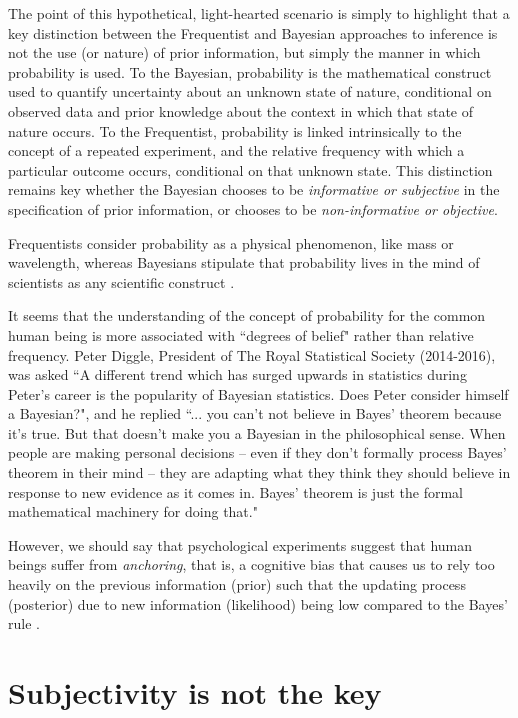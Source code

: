 The point of this hypothetical, light-hearted scenario is simply to highlight that a key distinction between the Frequentist and Bayesian approaches to inference is not the use (or nature) of prior information, but simply the manner in which probability is used. To the Bayesian, probability is the mathematical construct used to quantify uncertainty about an unknown state of nature, conditional on observed data and prior knowledge about the context in which that state of nature occurs. To the Frequentist, probability is linked intrinsically to the concept of a repeated experiment, and the relative frequency with which a particular outcome occurs, conditional on that unknown state. This distinction remains key whether the Bayesian chooses to be \textit{informative or subjective} in the specification of prior information, or chooses to be \textit{non-informative or objective}.

Frequentists consider probability as a physical phenomenon, like mass or wavelength, whereas Bayesians stipulate that probability lives in the mind of scientists as any scientific construct \cite{Parmigiani2008}.

It seems that the understanding of the concept of probability for the common human being is more associated with ``degrees of belief" rather than relative frequency. Peter Diggle, President of The Royal Statistical Society (2014-2016), was asked ``A different trend which has surged upwards in statistics during Peter's career is the popularity of Bayesian statistics. Does Peter consider himself a Bayesian?", and he replied ``... you can't not believe in Bayes' theorem because it's true. But that doesn't make you a Bayesian in the philosophical sense. When people are making personal decisions -- even if they don't formally process Bayes' theorem in their mind -- they are adapting what they think they should believe in response to new evidence as it comes in. Bayes' theorem is just the formal mathematical machinery for doing that."

However, we should say that psychological experiments suggest that human beings suffer from \textit{anchoring}, that is, a cognitive bias that causes us to rely too heavily on the previous information (prior) such that the updating process (posterior) due to new information (likelihood) being low compared to the Bayes' rule \cite{daniel2017thinking}.

\section{Subjectivity is not the key}\label{sec22}

